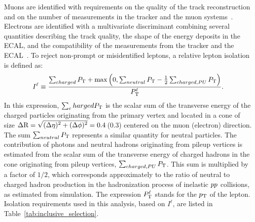 Muons are identified with requirements on the quality of
the track reconstruction and on the number of measurements in the
tracker and the muon systems~\cite{Chatrchyan:2012xi}.
Electrons are identified with a multivariate discriminant
combining several quantities describing the track quality,
the shape of the energy deposits in the ECAL,
and the compatibility of the measurements from the tracker and the
ECAL~\cite{Khachatryan:2015hwa}.
To reject non-prompt or misidentified leptons, a relative lepton isolation is defined as:
\begin{equation}
I^{\ell} \equiv \frac{\sum_{charged}  P_\mathrm{T} + \max\left( 0, \sum_{neutral}  P_\mathrm{T}
                                         - \frac{1}{2} \sum_{charged, PU} P_\mathrm{T}  \right )}{P_\mathrm{T}^{\ell}}.
\label{eq:reconstruction_isolation}
\end{equation}
In this expression, $\sum_charged  P_\mathrm{T}$ is the scalar sum of the
transverse energy of the charged particles originating from
the primary vertex and located in a cone of size
$\Delta \mathrm{R} = \sqrt{\smash[b]{(\Delta \eta)^2 + (\Delta \phi)^2}} = 0.4$\,(0.3)
centered on the muon (electron) direction. The sum
$\sum_{neutral}  P_\mathrm{T}$  represents
a similar quantity for neutral particles.
The contribution of photons and neutral hadrons originating from pileup vertices is estimated from the scalar sum of the transverse
energy of charged hadrons in the cone originating from pileup vertices,
$\sum_{charged, PU} P_\mathrm{T}$. This sum is multiplied by a factor of
$1/2$, which corresponds approximately to the ratio of neutral to charged
hadron production in the hadronization process
of inelastic $pp$ collisions, as estimated from simulation.
The expression $P_\mathrm{T}^{\ell}$ stands for the $p_\mathrm{T}$ of the lepton. Isolation requirements used in this analysis, based on $I^{\ell}$, are listed in Table~\ref{tab:inclusive_selection}.


